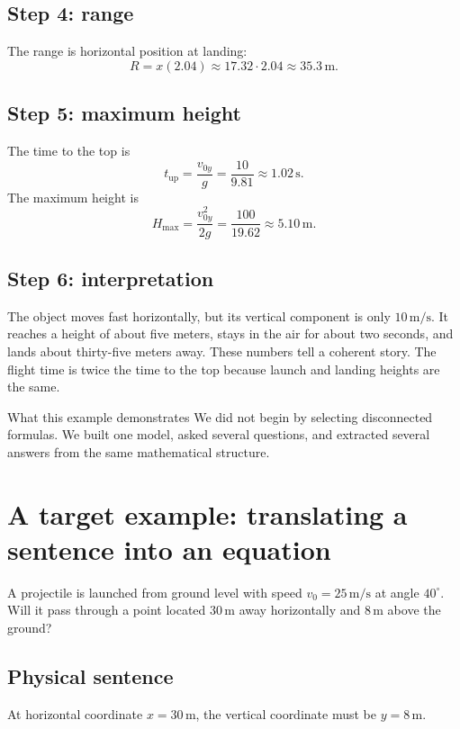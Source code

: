 \documentclass[11pt,a4paper]{article}
\begin{document}
\subsection{Step 4: range}

The range is horizontal position at landing:
\[
R=x(2.04)\approx17.32\cdot2.04\approx35.3\,\mathrm{m}.
\]

\subsection{Step 5: maximum height}

The time to the top is
\[
t_{\mathrm{up}}=\frac{v_{0y}}{g}=\frac{10}{9.81}\approx1.02\,\mathrm{s}.
\]
The maximum height is
\[
H_{\max}=\frac{v_{0y}^2}{2g}=\frac{100}{19.62}\approx5.10\,\mathrm{m}.
\]

\subsection{Step 6: interpretation}

The object moves fast horizontally, but its vertical component is only $10\,\mathrm{m/s}$. It reaches a height of about five meters, stays in the air for about two seconds, and lands about thirty-five meters away. These numbers tell a coherent story. The flight time is twice the time to the top because launch and landing heights are the same.

\begin{principlebox}{What this example demonstrates}
We did not begin by selecting disconnected formulas. We built one model, asked several questions, and extracted several answers from the same mathematical structure.
\end{principlebox}

\section{A target example: translating a sentence into an equation}

A projectile is launched from ground level with speed $v_0=25\,\mathrm{m/s}$ at angle $40^\circ$. Will it pass through a point located $30\,\mathrm{m}$ away horizontally and $8\,\mathrm{m}$ above the ground?

\subsection{Physical sentence}

At horizontal coordinate $x=30\,\mathrm{m}$, the vertical coordinate must be $y=8\,\mathrm{m}$.
\end{document}
